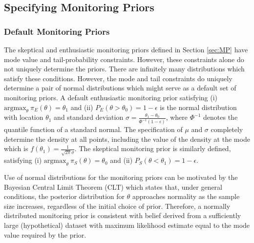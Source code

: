 \documentclass[useAMS,usenatbib,referee]{biom}
\begin{document}
\subsection{Specifying Monitoring Priors}\label{sec:mps}
\subsubsection{Default Monitoring Priors}
The skeptical and enthusiastic monitoring priors defined in Section \ref{sec:MP} have mode value and tail-probability constraints. 
%
However, these constraints alone do not uniquely determine the priors.
%
There are infinitely many distributions which satisfy these conditions.
%
However, the mode and tail constraints do uniquely determine a pair of normal distributions which might serve as a default set of monitoring priors. 
%
%
A default enthusiastic monitoring prior satisfying (i) $\text{argmax}_\theta~\pi_E(\theta)=\theta_1$
and (ii) $P_E(\theta > \theta_0)=1-\epsilon$ is the normal distribution with location $\theta_1$ and standard deviation $\sigma=\frac{\theta_1-\theta_0}{\Phi^{-1}(1-\epsilon)}$, where $\Phi^{-1}$ denotes the quantile function of a standard normal.
%
The specification of $\mu$ and $\sigma$ completely determine the density at all points, including the value of the density at the mode which is $f(\theta_1)=\frac{1}{\sqrt{2\pi}\sigma}$.
%
The skeptical monitoring prior is similarly defined, satisfying (i) $\text{argmax}_\theta~\pi_S(\theta)=\theta_0$ and (ii) $P_S(\theta < \theta_1)=1-\epsilon$.

Use of normal distributions for the monitoring priors can be motivated by the Bayesian Central Limit Theorem (CLT) \citep{LeCam2000} which states that, under general conditions, the posterior distribution for $\theta$ approaches normality as the sample size increases, regardless of the initial choice of prior.
%
Therefore, a normally distributed monitoring prior is consistent with belief derived from a sufficiently large (hypothetical) dataset with maximum likelihood estimate equal to the mode value required by the prior.
\end{document}
